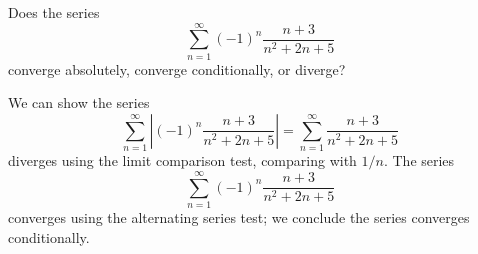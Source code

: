 \documentclass{ximera}
\begin{document}
\begin{question}
  Does the series
  \[
  \sum_{n=1}^\infty (-1)^n\frac{n+3}{n^2+2n+5}
  \]
  converge absolutely, converge conditionally, or diverge?
  \begin{prompt}
    \begin{multipleChoice}
    \end{multipleChoice}
    \begin{feedback}
      We can show the series
      \[
      \sum_{n=1}^\infty \left|(-1)^n\frac{n+3}{n^2+2n+5}\right|=
      \sum_{n=1}^\infty \frac{n+3}{n^2+2n+5}
      \]
      diverges using the limit comparison test, comparing with $1/n$.
      The series
      \[
      \sum_{n=1}^\infty (-1)^n\frac{n+3}{n^2+2n+5}
      \]
      converges using the alternating series test; we conclude the
      series converges conditionally.
    \end{feedback}
      \end{prompt}
    \end{question}
  
\end{document}
